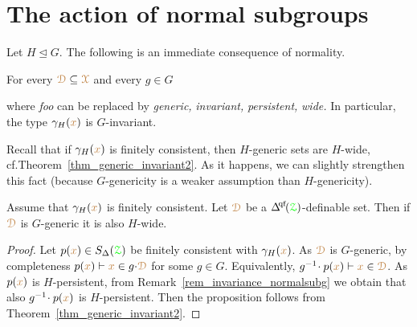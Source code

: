 \section{The action of normal subgroups}\label{normalsubgroups}

Let $H\trianglelefteq G$.
The following is an immediate consequence of normality.

\begin{remark}\label{rem_invariance_normalsubg}
%
  For every ${\color{brown}\EuScript D}\subseteq{\color{brown}\EuScript X}$ and every $g\in G$
  
  
  where \textit{foo\/} can be replaced by \textit{generic,} \textit{invariant,} \textit{persistent,} \textit{wide.}
  In particular, the type $\gamma_H({\color{brown} x})$ is $G$-invariant.
\end{remark}

Recall that if $\gamma_H({\color{brown} x})$ is finitely consistent, then $H$-generic sets are $H$-wide, cf.\@ Theorem~\ref{thm_generic_invariant2}.
As it happens, we can slightly strengthen this fact (because $G$-genericity is a weaker assumption than $H$-genericity).

\begin{proposition}\label{prop_Ggeneric_Hpersistent}
  Assume that $\gamma_H({\color{brown} x})$ is finitely consistent.
  Let ${\color{brown}\EuScript D}$ be a $\qfDelta(\grZ)$-definable set.
  Then if ${\color{brown}\EuScript D}$ is $G$-generic it is also $H$-wide.
\end{proposition}

\begin{proof}
  Let $p({\color{brown} x})\in S_\Delta({\color{green}\EuScript Z})$ be finitely consistent with $\gamma_H({\color{brown} x})$.
  As ${\color{brown}\EuScript D}$ is $G$-generic, by completeness $p({\color{brown} x})\vdash{\color{brown}x}\in g{\cdot}{\color{brown}\EuScript D}$ for some $g\in G$.
  Equivalently, $g^{-1}\!\cdot p({\color{brown} x})\vdash{\color{brown}x}\in{\color{brown}\EuScript D}$.
  As $p({\color{brown} x})$ is $H$-persistent, from Remark~\ref{rem_invariance_normalsubg} we obtain that also $g^{-1}\!\cdot p({\color{brown} x})$ is $H$-persistent.
  Then the proposition follows from Theorem~\ref{thm_generic_invariant2}.
\end{proof}

